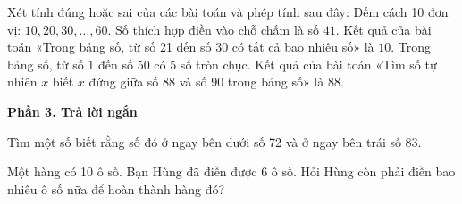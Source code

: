 \begin{ex} %
Xét tính đúng hoặc sai của các bài toán và phép tính sau đây:
\choiceTF
{Đếm cách 10 đơn vị: $10, 20, 30, \dots, 60$. Số thích hợp điền vào chỗ chấm là số $41$.}
{\True Kết quả của bài toán «Trong bảng số, từ số 21 đến số 30 có tất cả bao nhiêu số» là $10$.}
{\True Trong bảng số, từ số 1 đến số 50 có $5$ số tròn chục.}
{Kết quả của bài toán «Tìm số tự nhiên $x$ biết $x$ đứng giữa số 88 và số 90 trong bảng số» là $88$.}
\end{ex}

\textbf{Phần 3. Trả lời ngắn}

\begin{ex} %
Tìm một số biết rằng số đó ở ngay bên dưới số 72 và ở ngay bên trái số 83.
\end{ex}

\begin{ex} %
Một hàng có 10 ô số. Bạn Hùng đã điền được 6 ô số. Hỏi Hùng còn phải điền bao nhiêu ô số nữa để hoàn thành hàng đó?
\end{ex}

